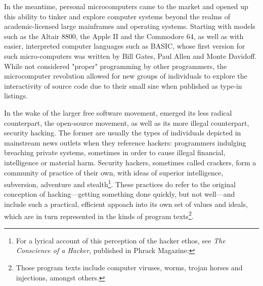 In the meantime, personal microcomputers came to the market and opened up this ability to tinker and explore computer systems beyond the realms of academic-licensed large mainframes and operating systems. Starting with models such as the Altair 8800, the Apple II and the Commodore 64, as well as with easier, interpreted computer languages such as BASIC, whose first version for such micro-computers was written by Bill Gates, Paul Allen and Monte Davidoff\cite{montfort_10_2014}. While not considered "proper" programming by other programmers, the microcomputer revolution allowed for new groups of individuals to explore the interactivity of source code due to their small size when published as type-in listings.

In the wake of the larger free software movement,  emerged its less radical counterpart, the open-source movement, as well as its more illegal counterpart, security hacking. The former are usually the types of individuals depicted in mainstream news outlets when they reference hackers: programmers indulging breaching private systems, sometimes in order to cause illegal financial, intelligence or material harm. Security hackers, sometimes called crackers, form a community of practice of their own, with ideas of superior intelligence, subversion, adventure and stealth\footnote{For a lyrical account of this perception of the hacker ethos, see \emph{The Conscience of a Hacker}, published in Phrack Magazine: }. These practices do refer to the original conception of hacking—getting something done quickly, but not well—and include such a practical, efficient appoach into its own set of values and ideals, which are in turn represented in the kinds of program texts\footnote{Those program texts include computer viruses, worms, trojan horses and injections, amongst others.}.

